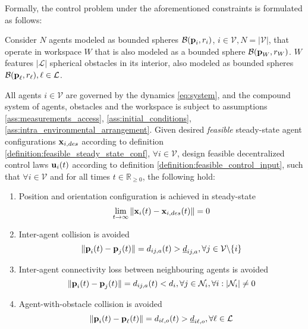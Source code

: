 Formally, the control problem under the aforementioned constraints is
formulated as follows:\\

\begin{bg_box}
\label{problem}
\begin{problem}
  Consider $N$ agents modeled as bounded spheres $\mathcal{B}(\bm{\mathbf{p}}_i, r_i)$,
  $i \in \mathcal{V}, N = |\mathcal{V}|$, that operate in workspace $W$ that is
  also modeled as a bounded sphere $\mathcal{B}(\bm{\mathbf{p}}_W,r_W)$. $W$
  features $|\mathcal{L}|$ spherical obstacles in its interior, also modeled as
  bounded spheres $\mathcal{B}(\bm{\mathbf{p}}_{\ell}, r_{\ell}), \ell \in \mathcal{L}$.

  All agents $i \in \mathcal{V}$ are governed by the dynamics \eqref{eq:system},
  and the compound system of agents, obstacles and the workspace is subject to
  assumptions \eqref{ass:measurements_access}, \eqref{ass:initial_conditions},
  \eqref{ass:intra_environmental_arrangement}. Given desired \textit{feasible}
  steady-state agent configurations $\bm{\mathbf{x}}_{i,des}$ according to definition
  \eqref{definition:feasible_steady_state_conf},
  $\forall i \in \mathcal{V}$, design feasible decentralized control laws
  $\bm{\mathbf{u}}_i(t)$ according to definition \eqref{definition:feasible_control_input},
  such that $\forall i \in \mathcal{V}$ and for all times $t \in \mathbb{R}_{\geq 0}$,
  the following hold:

  \begin{enumerate}

    \item Position and orientation configuration is achieved in steady-state
      $$\lim_{t \to \infty} \|\bm{\mathbf{x}}_i(t) - \bm{\mathbf{x}}_{i,des}(t)\| = 0$$

    \item Inter-agent collision is avoided
      $$\|\bm{\mathbf{p}}_i(t) - \bm{\mathbf{p}}_j(t)\| = d_{ij,a}(t) > \underline{d}_{ij,a},
      \forall j \in \mathcal{V} \backslash \{i\}$$

    \item Inter-agent connectivity loss between neighbouring agents is avoided
      $$ \|\bm{\mathbf{p}}_i(t) - \bm{\mathbf{p}}_j(t)\| = d_{ij,a} (t) < d_i,
      \forall j \in \mathcal{N}_i, \forall i : |\mathcal{N}_i| \not= 0$$

    \item Agent-with-obstacle collision is avoided
      $$ \|\bm{\mathbf{p}}_i(t) - \bm{\mathbf{p}}_{\ell}(t)\| = d_{i\ell,o} (t) > \underline{d}_{i\ell,o},
      \forall \ell \in \mathcal{L}$$


\end{enumerate}
\end{problem}
\end{bg_box}
